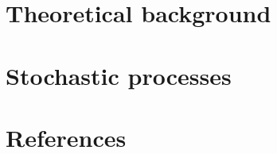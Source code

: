 

%










	\begin{frame}
		\titlepage
	\end{frame}
	
	\section{Theoretical background}	
		

	\section{Stochastic processes}			
	
%	
%	
%	
%	
%	
%	
%	
	
	\section{References}
	

